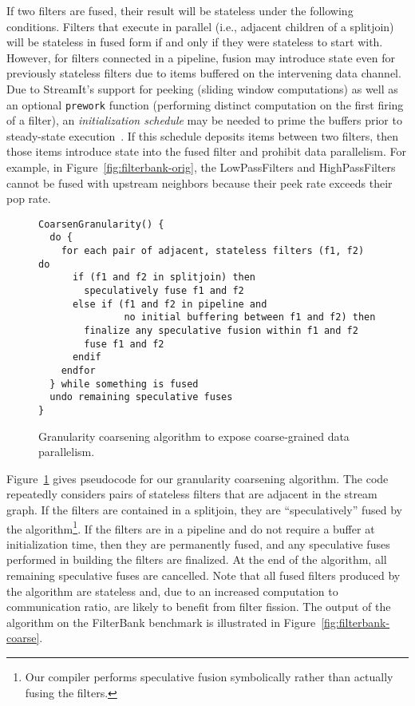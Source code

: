 If two filters are fused, their result will be stateless under the
following conditions.  Filters that execute in parallel (i.e.,
adjacent children of a splitjoin) will be stateless in fused form if
and only if they were stateless to start with.  However, for filters
connected in a pipeline, fusion may introduce state even for
previously stateless filters due to items buffered on the intervening
data channel.  Due to StreamIt's support for peeking (sliding window
computations) as well as an optional {\tt prework} function
(performing distinct computation on the first firing of a filter), an
{\it initialization schedule} may be needed to prime the buffers prior
to steady-state execution~\cite{karczma02thesis}.  If this schedule
deposits items between two filters, then those items introduce state
into the fused filter and prohibit data parallelism.  For example, in
Figure~\ref{fig:filterbank-orig}, the LowPassFilters and
HighPassFilters cannot be fused with upstream neighbors because their
peek rate exceeds their pop rate.

\begin{figure}[t]
\small
\begin{verbatim}
CoarsenGranularity() {
  do { 
    for each pair of adjacent, stateless filters (f1, f2) do
      if (f1 and f2 in splitjoin) then
        speculatively fuse f1 and f2
      else if (f1 and f2 in pipeline and
               no initial buffering between f1 and f2) then
        finalize any speculative fusion within f1 and f2
        fuse f1 and f2
      endif
    endfor
  } while something is fused
  undo remaining speculative fuses
}
\end{verbatim}
\caption{Granularity coarsening algorithm to expose coarse-grained
data parallelism.\label{fig:coarsening-code}}
\end{figure}

Figure~\ref{fig:coarsening-code} gives pseudocode for our granularity
coarsening algorithm.  The code repeatedly considers pairs of
stateless filters that are adjacent in the stream graph.  If the
filters are contained in a splitjoin, they are ``speculatively'' fused
by the algorithm\footnote{Our compiler performs speculative fusion
symbolically rather than actually fusing the filters.}.  
If the filters are in a pipeline and do not require a buffer at
initialization time, then they are permanently fused, and any
speculative fuses performed in building the filters are finalized.  At
the end of the algorithm, all remaining speculative fuses are
cancelled.  Note that all fused filters produced by the algorithm are
stateless and, due to an increased computation to communication ratio,
are likely to benefit from filter fission.  The output of the
algorithm on the FilterBank benchmark is illustrated in
Figure~\ref{fig:filterbank-coarse}.

